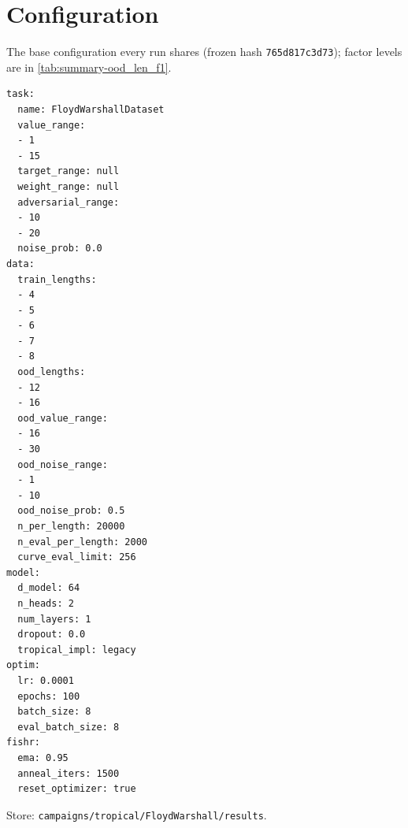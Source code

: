 \documentclass[10pt]{article}
\begin{document}
\section{Configuration}
The base configuration every run shares (frozen hash \texttt{765d817c3d73}); factor levels are in \autoref{tab:summary-ood_len_f1}.
{\footnotesize
\begin{verbatim}
task:
  name: FloydWarshallDataset
  value_range:
  - 1
  - 15
  target_range: null
  weight_range: null
  adversarial_range:
  - 10
  - 20
  noise_prob: 0.0
data:
  train_lengths:
  - 4
  - 5
  - 6
  - 7
  - 8
  ood_lengths:
  - 12
  - 16
  ood_value_range:
  - 16
  - 30
  ood_noise_range:
  - 1
  - 10
  ood_noise_prob: 0.5
  n_per_length: 20000
  n_eval_per_length: 2000
  curve_eval_limit: 256
model:
  d_model: 64
  n_heads: 2
  num_layers: 1
  dropout: 0.0
  tropical_impl: legacy
optim:
  lr: 0.0001
  epochs: 100
  batch_size: 8
  eval_batch_size: 8
fishr:
  ema: 0.95
  anneal_iters: 1500
  reset_optimizer: true
\end{verbatim}
}
Store: \texttt{campaigns/tropical/FloydWarshall/results}.
\end{document}
